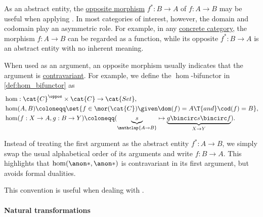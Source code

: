\begin{remark}\label{rem:opposite_morphism_argument_notation}
  As an abstract entity, the \hyperref[def:opposite_category/morphisms]{opposite morphism} \( f^*: B \to A \) of \( f: A \to B \) may be useful when applying . In most categories of interest, however, the domain and codomain play an asymmetric role. For example, in any \hyperref[def:concrete_category]{concrete category}, the morphism \( f: A \to B \) can be regarded as a function, while its opposite \( f^*: B \to A \) is an abstract entity with no inherent meaning.

  When used as an argument, an opposite morphism usually indicates that the argument is \hyperref[con:functor_argument_variance]{contravariant}. For example, we define the \( \hom \)-bifunctor in \cref{def:hom_bifunctor} as
  \begin{equation*}
    \begin{aligned}
      &\hom: \cat{C}^\oppos \times \cat{C} \to \cat{Set}, \\
      &\hom(A, B) \coloneqq \set{ f \in \mor(\cat{C}) \given \dom(f) = A \T{and} \cod(f) = B }, \\
      &\hom(f: X \to A, g: B \to Y) \coloneqq (\underbrace{s}_{\mathclap{A \to B}} \mapsto \underbrace{g \bincirc s \bincirc f}_{X \to Y}).
    \end{aligned}
  \end{equation*}

  Instead of treating the first argument as the abstract entity \( f^*: A \to B \), we simply swap the usual alphabetical order of its arguments and write \( f: B \to A \). This highlights that \( \hom(\anon*, \anon*) \) is contravariant in its first argument, but avoids formal dualities.

  This convention is useful when dealing with .
\end{remark}

\paragraph{Natural transformations}

